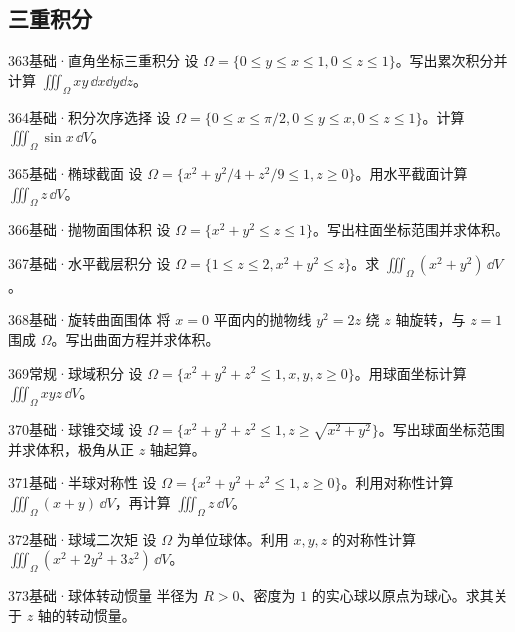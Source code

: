 \subsection{三重积分}
\begin{exercise}{363}{基础·直角坐标三重积分}
设 $\Omega=\{0\leq y\leq x\leq1,0\leq z\leq1\}$。写出累次积分并计算 $\iiint_\Omega xy\,\dd x\dd y\dd z$。
\end{exercise}
\begin{exercise}{364}{基础·积分次序选择}
设 $\Omega=\{0\leq x\leq\pi/2,0\leq y\leq x,0\leq z\leq1\}$。计算 $\iiint_\Omega\sin x\,\dd V$。
\end{exercise}
\begin{exercise}{365}{基础·椭球截面}
设 $\Omega=\{x^2+y^2/4+z^2/9\leq1,z\geq0\}$。用水平截面计算 $\iiint_\Omega z\,\dd V$。
\end{exercise}
\begin{exercise}{366}{基础·抛物面围体积}
设 $\Omega=\{x^2+y^2\leq z\leq1\}$。写出柱面坐标范围并求体积。
\end{exercise}
\begin{exercise}{367}{基础·水平截层积分}
设 $\Omega=\{1\leq z\leq2,x^2+y^2\leq z\}$。求 $\iiint_\Omega(x^2+y^2)\,\dd V$。
\end{exercise}
\begin{exercise}{368}{基础·旋转曲面围体}
将 $x=0$ 平面内的抛物线 $y^2=2z$ 绕 $z$ 轴旋转，与 $z=1$ 围成 $\Omega$。写出曲面方程并求体积。
\end{exercise}
\begin{exercise}{369}{常规·球域积分}
设 $\Omega=\{x^2+y^2+z^2\leq1,x,y,z\geq0\}$。用球面坐标计算 $\iiint_\Omega xyz\,\dd V$。
\end{exercise}
\begin{exercise}{370}{基础·球锥交域}
设 $\Omega=\{x^2+y^2+z^2\leq1,z\geq\sqrt{x^2+y^2}\}$。写出球面坐标范围并求体积，极角从正 $z$ 轴起算。
\end{exercise}
\begin{exercise}{371}{基础·半球对称性}
设 $\Omega=\{x^2+y^2+z^2\leq1,z\geq0\}$。利用对称性计算 $\iiint_\Omega(x+y)\,\dd V$，再计算 $\iiint_\Omega z\,\dd V$。
\end{exercise}
\begin{exercise}{372}{基础·球域二次矩}
设 $\Omega$ 为单位球体。利用 $x,y,z$ 的对称性计算 $\iiint_\Omega(x^2+2y^2+3z^2)\,\dd V$。
\end{exercise}
\begin{exercise}{373}{基础·球体转动惯量}
半径为 $R>0$、密度为 $1$ 的实心球以原点为球心。求其关于 $z$ 轴的转动惯量。
\end{exercise}
